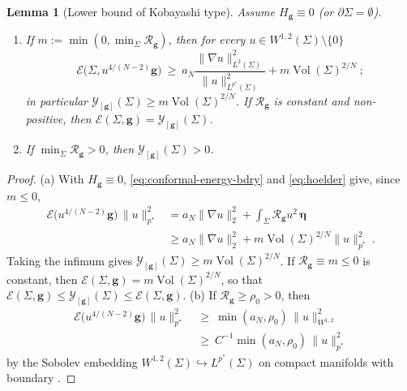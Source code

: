\documentclass[aps,prd,reprint,amsmath,amssymb,nofootinbib,longbibliography]{revtex4-2}
\DeclareMathOperator{\Vol}{Vol}
\newcommand{\g}{\mathbf{g}}                 %
\newcommand{\Rs}{\mathcal{R}}               %
\newcommand{\vol}{\boldsymbol{\eta}}        %
\newcommand{\EH}{\mathcal{E}}               %
\newcommand{\Y}{\mathcal{Y}}                %
\newcommand{\pstar}{p^{*}}
\newcommand{\aN}{a_N}
\theoremstyle{plain}
\newtheorem{lemma}[theorem]{Lemma}
\theoremstyle{definition}
\theoremstyle{remark}
\begin{document}
\begin{lemma}[Lower bound of Kobayashi type]
\label{lem:kobayashi}
Assume $H_\g\equiv0$ (or $\partial\Sigma=\emptyset$).
\begin{enumerate}
\item[(a)] If $m:=\min(0,\min_\Sigma\Rs_\g)$, then for every $u\in W^{1,2}(\Sigma)\setminus\{0\}$
\begin{equation}
\label{eq:kobayashi}
\EH\big(\Sigma,u^{4/(N-2)}\g\big)\ \ge\ \aN\frac{\|\nabla u\|^2_{L^2(\Sigma)}}{\|u\|^2_{L^{\pstar}(\Sigma)}}+m\Vol(\Sigma)^{2/N}\ ;
\end{equation}
in particular $\Y_{[\g]}(\Sigma)\ge m\Vol(\Sigma)^{2/N}$. If $\Rs_\g$ is constant and non-positive, then $\EH(\Sigma,\g)=\Y_{[\g]}(\Sigma)$.
\item[(b)] If $\min_\Sigma\Rs_\g>0$, then $\Y_{[\g]}(\Sigma)>0$.
\end{enumerate}
\end{lemma}
\begin{proof}
(a) With $H_\g\equiv0$, \eqref{eq:conformal-energy-bdry} and \eqref{eq:hoelder} give, since $m\le0$,
\begin{align*}
\EH\big(u^{4/(N-2)}\g\big)\,\|u\|^2_{\pstar}&=\aN\|\nabla u\|^2_2+\int_\Sigma\Rs_\g u^2\,\vol\\
&\ge\aN\|\nabla u\|^2_2+m\Vol(\Sigma)^{2/N}\|u\|^2_{\pstar}\ .
\end{align*}
Taking the infimum gives $\Y_{[\g]}(\Sigma)\ge m\Vol(\Sigma)^{2/N}$. If $\Rs_\g\equiv m\le0$ is constant, then $\EH(\Sigma,\g)=m\Vol(\Sigma)^{2/N}$, so that $\EH(\Sigma,\g)\le\Y_{[\g]}(\Sigma)\le\EH(\Sigma,\g)$. (b) If $\Rs_\g\ge\rho_0>0$, then
\begin{align*}
\EH\big(u^{4/(N-2)}\g\big)\,\|u\|^2_{\pstar}&\ \ge\ \min(\aN,\rho_0)\,\|u\|^2_{W^{1,2}}\\
&\ \ge\ C^{-1}\min(\aN,\rho_0)\,\|u\|^2_{\pstar}
\end{align*}
by the Sobolev embedding $W^{1,2}(\Sigma)\hookrightarrow L^{\pstar}(\Sigma)$ on compact manifolds with boundary \cite{Hebey1996}.
\end{proof}
\end{document}

